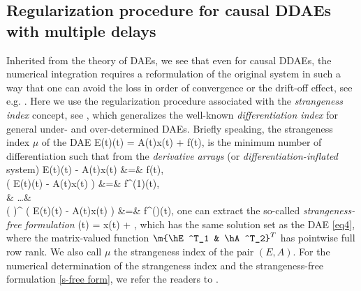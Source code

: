 \documentclass[final,reqno]{siamltex}
\begin{document}
\subsection{Regularization procedure for causal DDAEs with multiple delays}\label{Sec2.1}
Inherited from the theory of DAEs, we see that even for causal DDAEs, the numerical integration requires a reformulation of the original system in such a way that one can 
avoid the loss in order of convergence or the drift-off effect, see e.g. \cite{BreCP96,KunM06}. Here we use the regularization procedure 
associated with the \emph{strangeness index} concept, see \cite{KunM06}, which generalizes the well-known \emph{differentiation index} \cite{BreCP96} for general 
under- and over-determined DAEs. Briefly speaking, the strangeness index $\mu$ of the DAE 
%
\be\label{eq4}
 E(t)(t) = A(t)x(t) + f(t), 
\ee
%
is the minimum number of differentiation such that from the \emph{derivative arrays} (or \emph{differentiation-inflated} system)
%
\bens
 E(t)(t) - A(t)x(t)  &=& f(t), \\
 \ddt \left( E(t)(t) - A(t)x(t) \right) &=& f^{(1)}(t), \\
 & \dots & \\
 \left( \ddt \right)^{\mu} \left( E(t)(t) - A(t)x(t) \right) &=& f^{(\mu)}(t),
\eens
%
one can extract the so-called \emph{strangeness-free formulation}
%
\be\label{s-free form}
  (t) =  x(t) + ,
\ee
%
which has the same solution set as the DAE \eqref{eq4}, where the matrix-valued function $\m{\hE^T_1 & \hA^T_2}^T$ has pointwise full row rank.
We also call $\mu$ the strangeness index of the pair $(E,A)$. 
For the numerical determination of the strangeness index and the strangeness-free formulation \eqref{s-free form}, we refer the readers to 
\cite{KunMRW97,KunMS05}.
\end{document}
